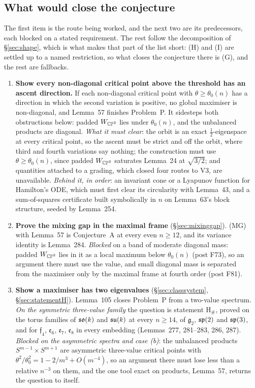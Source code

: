 \subsection{What would close the conjecture}\label{sec:close}

The first item is the route being worked, and the next two are its predecessors, each blocked on a stated requirement. The rest follow the decomposition of \S\ref{sec:shape}, which is what makes that part of the list short: (H) and (I) are settled up to a named restriction, so what closes the conjecture there is (G), and the rest are fallbacks.

\begin{enumerate}[leftmargin=1.8em]
\item \textbf{Show every non-diagonal critical point above the threshold has an ascent direction.} If each non-diagonal critical point with $\theta\ge\theta_0(n)$ has a direction in which the second variation is positive, no global maximiser is non-diagonal, and Lemma~57 finishes Problem~P. It sidesteps both obstructions below: padded $W_{\mathbb{CP}^2}$ lies under $\theta_0(n)$, and the unbalanced products are diagonal. \emph{What it must clear}: the orbit is an exact $\tfrac12$-eigenspace at every critical point, so the ascent must be strict and off the orbit, where third and fourth variations say nothing; the construction must use $\theta\ge\theta_0(n)$, since padded $W_{\mathbb{CP}^2}$ saturates Lemma~24 at $\sqrt{3/2}$; and quantities attached to a grading, which closed four routes to V3, are unavailable. \emph{Behind it, in order}: an invariant cone or a Lyapunov function for Hamilton's ODE, which must first clear its circularity with Lemma~43, and a sum-of-squares certificate built symbolically in $n$ on Lemma~63's block structure, seeded by Lemma~254.

\item \textbf{Prove the mixing gap in the maximal frame} (\S\ref{sec:mixinggap}). (MG) with Lemma~57 is Conjecture~A at every even $n\ge12$, and its variance identity is Lemma~284. \emph{Blocked} on a band of moderate diagonal mass: padded $W_{\mathbb{CP}^2}$ lies in it as a local maximum below $\theta_0(n)$ (post F73), so an argument there must use the value, and small diagonal mass is separated from the maximiser only by the maximal frame at fourth order (post F81).

\item \textbf{Show a maximiser has two eigenvalues} (\S\ref{sec:classsystem}, \S\ref{sec:statementH}). Lemma~105 closes Problem~P from a two-value spectrum. \emph{On the symmetric three-value family} the question is statement H$_\#$, proved on the torus families of $\mathfrak{so}(k)$ and $\mathfrak{su}(k)$ at every $n\ge14$, of $\mathfrak g_2$, $\mathfrak{sp}(2)$ and $\mathfrak{sp}(3)$, and for $\mathfrak f_4$, $\mathfrak e_6$, $\mathfrak e_7$, $\mathfrak e_8$ in every embedding (Lemmas~277, 281--283, 286, 287). \emph{Blocked on the asymmetric spectra and case (b)}: the unbalanced products $S^{m-1}\times S^{m+1}$ are asymmetric three-value critical points with $\theta^2/\theta_0^2=1-2/m^3+O(m^{-4})$, so an argument there must lose less than a relative $n^{-3}$ on them, and the one tool exact on products, Lemma~57, returns the question to itself.


\end{enumerate}
